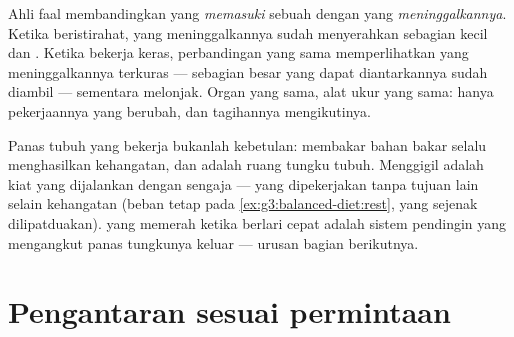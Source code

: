 \begin{example}\label{ex:g7:organs-at-work:measure}
Ahli faal membandingkan  yang \emph{memasuki} sebuah  dengan
 yang \emph{meninggalkannya}. Ketika beristirahat,  yang
meninggalkannya sudah menyerahkan sebagian kecil  dan
. Ketika bekerja keras, perbandingan yang sama
memperlihatkan  yang meninggalkannya terkuras --- sebagian besar
 yang dapat diantarkannya sudah diambil --- sementara  melonjak. Organ yang sama, alat ukur yang sama: hanya
pekerjaannya yang berubah, dan tagihannya mengikutinya.
\end{example}

\begin{remark}\label{rem:g7:organs-at-work:warmth}
Panas tubuh yang bekerja bukanlah kebetulan: membakar bahan bakar
selalu menghasilkan kehangatan, dan  adalah ruang tungku tubuh.
Menggigil adalah kiat yang dijalankan dengan sengaja ---  yang
dipekerjakan tanpa tujuan lain selain kehangatan
(beban tetap pada \cref{ex:g3:balanced-diet:rest}, yang sejenak
dilipatduakan).  yang memerah ketika berlari cepat adalah sistem
pendingin yang mengangkut panas tungkunya keluar --- urusan bagian
berikutnya.
\end{remark}

\section{Pengantaran sesuai permintaan}

